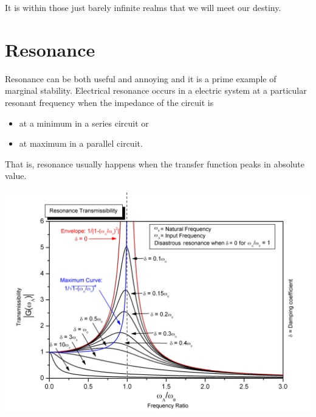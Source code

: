 \documentclass[11pt]{book}
\begin{document}
It is within those just barely infinite realms that we will meet our destiny.


\section{Resonance}
Resonance can be both useful and annoying and it is a prime example of marginal stability.
Electrical resonance occurs in a electric system at a particular resonant frequency when the impedance of the circuit is 
\begin{itemize}
	\item at a minimum in a series circuit or
	\item at maximum in a parallel circuit.
\end{itemize}
That is, resonance usually happens when the transfer function peaks in absolute value. 

\begin{center}
	\includegraphics[width=\textwidth]{figures/14.01.png}
\end{center}
\end{document}
